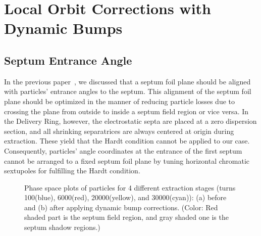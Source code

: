 \documentclass[aps,prstab,onecolumn,preprint]{revtex4-1}
\begin{document}
\section{\label{sec:bump}Local Orbit Corrections with Dynamic Bumps}

\subsection{\label{sec:bump0}Septum Entrance Angle}

In the previous paper~\cite{mu2e}, we discussed that a septum foil plane should be aligned with particles' entrance angles to the septum. This alignment of the septum foil plane should be optimized in the manner of reducing particle losses due to crossing the plane from outside to inside a septum field region or vice versa. In the Delivery Ring, however, the electrostatic septa are placed at a zero dispersion section, and all shrinking separatrices are always centered at origin during extraction. These yield that the Hardt condition cannot be applied to our case. Consequently, particles' angle coordinates at the entrance of the first septum cannot be arranged to a fixed septum foil plane by tuning horizontal chromatic sextupoles for fulfilling the Hardt condition.

\begin{figure}[!hbtp]
  \caption{\label{fig:bump1}Phase space plots of particles for 4 different extraction stages (turns 100(blue), 6000(red), 20000(yellow), and 30000(cyan)): (a) before and (b) after applying dynamic bump corrections. (Color: Red shaded part is the septum field region, and gray shaded one is the septum shadow regions.)}
\end{figure}
\end{document}
